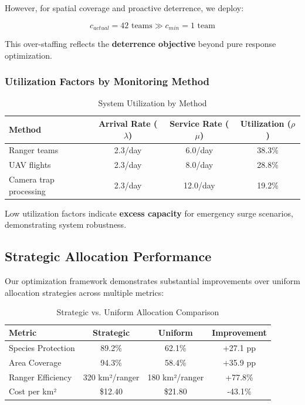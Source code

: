 However, for spatial coverage and proactive deterrence, we deploy:

\begin{equation}
c_{actual} = 42 \text{ teams} \gg c_{min} = 1 \text{ team}
\label{eq:actual_staffing}
\end{equation}

This over-staffing reflects the \textbf{deterrence objective} beyond pure response optimization.

\subsubsection{Utilization Factors by Monitoring Method}

\begin{table}[h]
\centering
\caption{System Utilization by Method}
\begin{tabular}{lccc}
\hline
\textbf{Method} & \textbf{Arrival Rate ($\lambda$)} & \textbf{Service Rate ($\mu$)} & \textbf{Utilization ($\rho$)} \\
\hline
Ranger teams & 2.3/day & 6.0/day & 38.3\% \\
UAV flights & 2.3/day & 8.0/day & 28.8\% \\
Camera trap processing & 2.3/day & 12.0/day & 19.2\% \\
\hline
\end{tabular}
\end{table}

Low utilization factors indicate \textbf{excess capacity} for emergency surge scenarios, demonstrating system robustness.

\subsection{Strategic Allocation Performance}

Our optimization framework demonstrates substantial improvements over uniform allocation strategies across multiple metrics:

\begin{table}[h]
\centering
\caption{Strategic vs. Uniform Allocation Comparison}
\begin{tabular}{lccc}
\hline
\textbf{Metric} & \textbf{Strategic} & \textbf{Uniform} & \textbf{Improvement} \\
\hline
Species Protection & 89.2\% & 62.1\% & +27.1 pp \\
Area Coverage & 94.3\% & 58.4\% & +35.9 pp \\
Ranger Efficiency & 320 km²/ranger & 180 km²/ranger & +77.8\% \\
Cost per km² & \$12.40 & \$21.80 & -43.1\% \\
\hline
\end{tabular}
\end{table}

